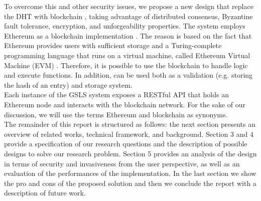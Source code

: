 To overcome this and other security issues, we propose a new design that replace the DHT with blockchain \cite{nakamoto_bitcoin_2008}, taking advantage of distributed consensus, Byzantine fault tolerance, encryption, and unforgeability properties. The system employs Ethereum as a blockchain implementation \cite{wood_ethereum_2014}. The reason is based on the fact that Ethereum provides users with sufficient storage and a Turing-complete programming language that runs on a virtual machine, called Ethereum Virtual Machine (EVM) \cite{wood_ethereum_2014}. Therefore, it is possible to use the blockchain to handle logic and execute functions. In addition, can be used both as a validation (e.g. storing the hash of an entry) and storage system. 
\\

Each instance of the GSLS system exposes a RESTful API that holds an Ethereum node and interacts with the blockchain network. For the sake of our discussion, we will use the terms Ethereum and blockchain as synonyms.
\\

The remainder of this report is structured as follows: the next section presents an overview of related works, technical framework, and background. Section 3 and 4 provide a specification of our research questions and the description of possible designs to solve our research problem. Section 5 provides an analysis of the design in terms of security and invasiveness from the user perspective, as well as an evaluation of the performances of the implementation. In the last section we show the pro and cons of the proposed solution and then we conclude the report with a description of future work. 
